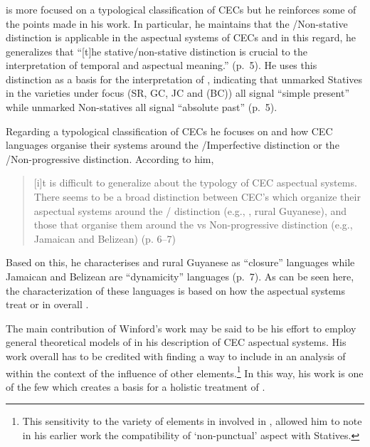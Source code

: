 \subsubsection{\citet{Winford2001}}\label{sec:2.1.5.1}

\citet{Winford2001} is more focused on a typological classification of
CECs but he reinforces some of the points made in his \citeyear{Winford1993} work.  In particular, he maintains that the \slash Non-stative distinction is
applicable in the aspectual systems of CECs and in this regard, he
generalizes that ``[t]he stative\slash non-stative distinction is crucial to
the interpretation of temporal and aspectual meaning.” (p.~5).  He
uses this distinction as a basis for the interpretation of ,
indicating that unmarked Statives in the varieties under focus (SR,
GC, JC and  (BC)) all signal ``simple present” while
unmarked Non-statives all signal ``absolute past” (p.~5).

Regarding a typological classification of CECs he focuses on
 and how CEC languages organise their systems around
the \slash Imper\-fective distinction or the
\slash Non-progressive distinction.  According to him,

\begin{quote}
[i]t is difficult to generalize about the typology of CEC aspectual
systems. There seems to be a broad distinction between CEC’s which
organize their aspectual systems around the \slash {} distinction (e.g., , rural Guyanese), 
and those that organise them around the  vs Non-progressive distinction (e.g., Jamaican and Belizean) (p. 6--7)
\end{quote}

Based on this, he characterises  and rural Guyanese as ``closure”
languages while Jamaican and Belizean are ``dynamicity” languages
(p.~7). As can be seen here, the characterization of these languages
is based on how the aspectual systems treat  or
 in overall .

The main contribution of Winford’s work may be said to be his effort
to employ general theoretical models of  in his description of
CEC aspectual systems.  His work overall has to be credited with
finding a way to include  in an analysis of 
within the context of the influence of other elements.\footnote{This
  sensitivity to the variety of elements in involved in ,
  allowed him to note in his earlier work \citep[389]{Winford2000} the
  compatibility of `non-punctual’ aspect with Statives.} In this
way, his work is one of the few which creates a basis for a holistic
treatment of .

